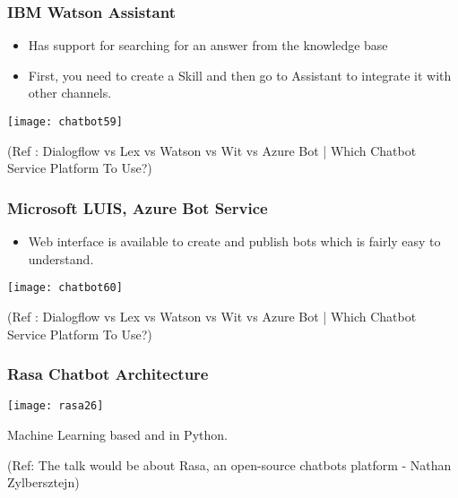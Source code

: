  \begin{frame}[fragile]\frametitle{IBM Watson Assistant}
\begin{itemize}
\item Has support for searching for an answer from the knowledge base 
\item First, you need to create a Skill and then go to Assistant to integrate it with other channels.
\end{itemize}

\begin{center}
\texttt{[image: chatbot59]}

\tiny{(Ref : Dialogflow vs Lex vs Watson vs Wit vs Azure Bot | Which Chatbot Service Platform To Use?)}
\end{center}
\end{frame}

 \begin{frame}[fragile]\frametitle{Microsoft LUIS, Azure Bot Service}
\begin{itemize}
\item Web interface is available to create and publish bots which is fairly easy to understand.
\end{itemize}

\begin{center}
\texttt{[image: chatbot60]}

\tiny{(Ref : Dialogflow vs Lex vs Watson vs Wit vs Azure Bot | Which Chatbot Service Platform To Use?)}
\end{center}
\end{frame}



\begin{frame}[fragile]\frametitle{Rasa Chatbot Architecture}


\begin{center}
\texttt{[image: rasa26]}
\end{center}

Machine Learning based and in Python.

{\tiny (Ref: The talk would be about Rasa, an open-source chatbots platform - Nathan Zylbersztejn)}

\end{frame}


